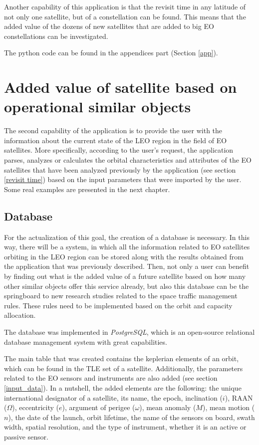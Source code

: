 Another capability of this application is that the revisit time in any latitude of not only one satellite, but of a constellation can be found. This means that the added value of the dozens of new satellites that are added to big EO constellations can be investigated.

\bigskip
The python code can be found in the appendices part (Section \ref{app}).

\bigskip
\section{Added value of satellite based on operational similar objects}
\label{added value}
\bigskip

The second capability of the application is to provide the user with the information about the current state of the LEO region in the field of EO satellites. More specifically, according to the user's request, the application parses, analyzes or calculates the orbital characteristics and attributes of the EO satellites that have been analyzed previously by the application (see section \ref{revisit time}) based on the input parameters that were imported by the user. Some real examples are presented in the next chapter.

\bigskip
\subsection{Database}
\bigskip

For the actualization of this goal, the creation of a database is necessary. In this way, there will be a system, in which all the information related to EO satellites orbiting in the LEO region can be stored along with the results obtained from the application that was previously described. Then, not only a user can benefit by finding out what is the added value of a future satellite based on how many other similar objects offer this service already, but also this database can be the springboard to new research studies related to the space traffic management rules. These rules need to be implemented based on the orbit and capacity allocation.

\bigskip
The database was implemented in \textit{PostgreSQL}, which is an open-source relational database management system with great capabilities.  

The main table that was created contains the keplerian elements of an orbit, which can be found in the TLE set of a satellite. Additionally, the parameters related to the EO sensors and instruments are also added (see section \ref{input_data}). In a nutshell, the added elements are the following: the unique international designator of a satellite, its name, the epoch, inclination ($i$), RAAN ($\Omega$), eccentricity ($e$), argument of perigee ($\omega$), mean anomaly ($M$), mean motion ($n$), the date of the launch, orbit lifetime, the name of the sensors on board, swath width, spatial resolution, and the type of instrument, whether it is an active or passive sensor.

